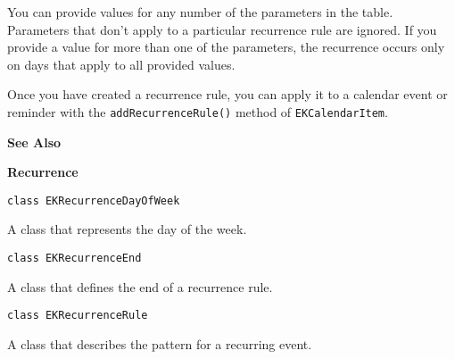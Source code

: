 \documentclass{article}
\begin{document}
You can provide values for any number of the parameters in the table. Parameters that don't apply to a particular recurrence rule are ignored. If you provide a value for more than one of the parameters, the recurrence occurs only on days that apply to all provided values.

Once you have created a recurrence rule, you can apply it to a calendar event or reminder with the \texttt{addRecurrenceRule()} method of \texttt{EKCalendarItem}.

\textbf{See Also}

\textbf{Recurrence}

\texttt{class EKRecurrenceDayOfWeek}

A class that represents the day of the week.

\texttt{class EKRecurrenceEnd}

A class that defines the end of a recurrence rule.

\texttt{class EKRecurrenceRule}

A class that describes the pattern for a recurring event.

\newpage
\end{document}
